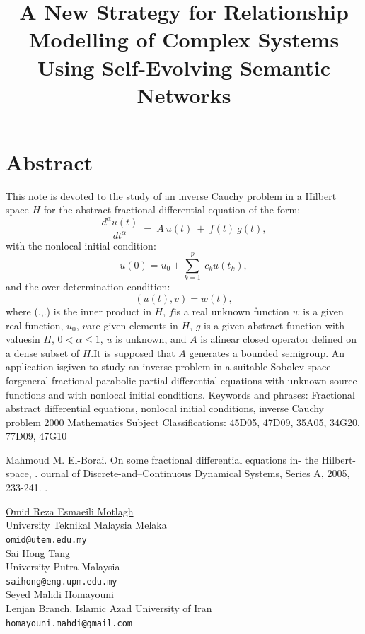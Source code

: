 \documentclass[article, A4, 11pt]{llncs}%
\begin{document}
\section*{Abstract}



This note is devoted to the study of an inverse Cauchy problem in a Hilbert space $H$ for the abstract fractional differential equation of the form:  $$\frac{d^{\alpha}u(t)}{dt^\alpha}~=~A~u(t)~+~f(t)~g(t),$$with the nonlocal initial condition:$$u(0) = u_0 + \sum_{k=1}^p~c_k u(t_k),$$and the over determination condition:$$(u(t), v) = w (t),$$where (.,.) is the inner product in $H$, $f$is a real unknown function $w$ is a given real function, $u_0$, $v$are given elements in $H$, $g$ is a given abstract function with valuesin $H$, $0 < \alpha \leq 1 $, $u$ is unknown, and $A$ is alinear closed operator defined on a dense subset of $H$.It is supposed that $A$ generates a bounded semigroup. An application isgiven to study an inverse problem in a suitable Sobolev space forgeneral fractional parabolic partial differential equations with  unknown source functions and with nonlocal initial conditions.
Keywords and phrases: Fractional abstract differential equations, nonlocal initial conditions, inverse Cauchy problem 
2000 Mathematics Subject Classifications: 45D05, 47D09, 35A05, 34G20, 77D09, 47G10


\begin{thebibliography}{10}
{\sc Mahmoud M. El-Borai}. {On some fractional differential  equations in- the Hilbert-space, }. ournal of Discrete-and--Continuous Dynamical Systems, Series A, 2005, 233-241. .
\end{thebibliography} %

\title{A New Strategy for Relationship Modelling of Complex Systems Using Self-Evolving Semantic Networks}
 \author{} \institute{}
\maketitle
\begin{center}
{\large \underline{Omid Reza Esmaeili Motlagh}}\\
University Teknikal Malaysia Melaka\\
{\tt omid@utem.edu.my}
\\ \vspace{4mm}
{\large Sai Hong Tang}\\
University Putra Malaysia\\
{\tt saihong@eng.upm.edu.my}
\\ \vspace{4mm}
{\large Seyed Mahdi  Homayouni}\\
Lenjan Branch,  Islamic Azad University of Iran\\
{\tt homayouni.mahdi@gmail.com}
\end{center}
\end{document}
